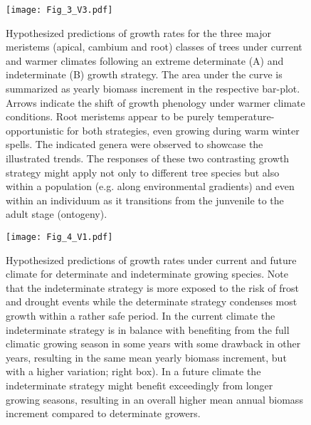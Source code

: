 \documentclass{article}
\begin{document}
								\begin{figure}
								\centering
								\texttt{[image: Fig\_3\_V3.pdf]} 
								\caption{Hypothesized predictions of growth rates for the three major meristems (apical, cambium and root) classes of trees under current and warmer climates following an extreme determinate (A) and indeterminate (B) growth strategy. The area under the curve is summarized as yearly biomass increment in the respective bar-plot. Arrows indicate the shift of growth phenology under warmer climate conditions. Root meristems appear to be purely temperature-opportunistic for both strategies, even growing during warm winter spells. The indicated genera were observed to showcase the illustrated trends. The responses of these two contrasting growth strategy might apply not only to different tree species but also within a population (e.g. along environmental gradients) and even within an individuum as it transitions from the junvenile to the adult stage (ontogeny).}
								\label{fig:fig_3xxx}
							\end{figure}
	
								\begin{figure}
								\centering
								\texttt{[image: Fig\_4\_V1.pdf]} 
								\caption{Hypothesized predictions of growth rates under current and future climate for determinate and indeterminate growing species. Note that the indeterminate strategy is more exposed to the risk of frost and drought events while the determinate strategy condenses most growth within a rather safe period. In the current climate the indeterminate strategy is in balance with benefiting from the full climatic growing season in some years with some drawback in other years, resulting in the same mean yearly biomass increment, but with a higher variation; right box). In a future climate the indeterminate strategy might benefit exceedingly from longer growing seasons, resulting in an overall higher mean annual biomass increment compared to determinate growers.}
								\label{fig:fig_4xxx}
							\end{figure}
	\pagebreak
\end{document}
